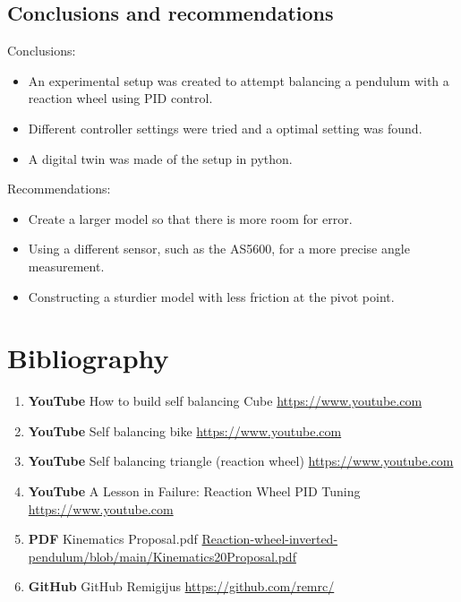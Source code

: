 \documentclass{article}
\begin{document}
\begin{multicols}{2}
\section{Conclusions and recommendations}
Conclusions:
\begin{itemize}
\item An experimental setup was created to attempt balancing a pendulum with a reaction wheel using PID control.
\item Different controller settings were tried and a optimal setting was found. 
\item A digital twin was made of the setup in python.  
\end{itemize}
Recommendations:
\begin{itemize}
\item Create a larger model so that there is more room for error.
\item Using a different sensor, such as the AS5600, for a more precise angle measurement. 
\item Constructing a sturdier model with less friction at the pivot point.
\end{itemize}

\end{multicols}
\section{Bibliography}
\begin{enumerate}
    \item \textbf{YouTube} How to build self balancing Cube \href{https://www.youtube.com/watch?v=AJQZFHJzwt4}{https://www.youtube.com}
    \item \textbf{YouTube} Self balancing bike  \href{https://www.youtube.com/watch?v=Je9Y2WaRB6g&t=7s}{https://www.youtube.com}
    \item \textbf{YouTube} Self balancing triangle (reaction wheel)  \href{https://www.youtube.com/watch?v=dTYiqNcXw68&t=154s}{https://www.youtube.com}
    \item \textbf{YouTube} A Lesson in Failure: Reaction Wheel PID Tuning \href{https://www.youtube.com/watch?v=kMCPTmi7f-4&list=PLMAbfx2u_zm4uqeRiwqP0UWDNL2hisYsA&index=6&t=721s}{https://www.youtube.com}
    \item \textbf{PDF} Kinematics Proposal.pdf  \href{https://github.com/B-Paweekorn/Reaction-wheel-inverted-pendulum/blob/main/Kinematics%20Proposal.pdf}{Reaction-wheel-inverted-pendulum/blob/main/Kinematics20Proposal.pdf}
    \item \textbf{GitHub} GitHub Remigijus  \href{https://github.com/remrc/}{https://github.com/remrc/}
    
\end{enumerate}
\newpage
\end{document}
